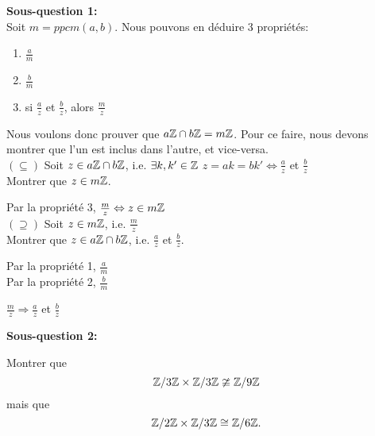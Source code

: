 \textbf{Sous-question 1:} \\

Soit $m = ppcm(a,b)$. Nous pouvons en déduire 3 propriétés:\\

\begin{enumerate}
	\item $\frac{a}{m}$
	\item $\frac{b}{m}$
	\item si $\frac{a}{z}$ et $\frac{b}{z}$, alors $\frac{m}{z}$ \\
\end{enumerate}

Nous voulons donc prouver que $a\mathbb{Z} \cap b\mathbb{Z} = m\mathbb{Z}$. Pour ce faire, nous devons montrer que l'un est inclus dans l'autre, et vice-versa. \\

$(\subseteq)$ Soit $z \in a\mathbb{Z} \cap b\mathbb{Z} $, i.e. $\exists k,{k}' \in \mathbb{Z} $ \hspace{1cm} $z = ak = b{k}' \Leftrightarrow \frac{a}{z}$ et $\frac{b}{z}$ \\

Montrer que $z \in m\mathbb{Z}$. 

Par la propriété 3, $\frac{m}{z} \Leftrightarrow z \in m\mathbb{Z}$ \\

$(\supseteq)$ Soit $z \in m\mathbb{Z} $, i.e. $\frac{m}{z}$ \\

Montrer que $z \in a\mathbb{Z} \cap b\mathbb{Z}$, i.e. $\frac{a}{z}$ et $\frac{b}{z}$. \\

\begin{minipage}{.5\textwidth}
	Par la propriété 1, $\frac{a}{m}$\\

	Par la propriété 2, $\frac{b}{m}$\\
\end{minipage}
\begin{minipage}{.5\textwidth}
	$\frac{m}{z} \Rightarrow \frac{a}{z}$ et $\frac{b}{z}$ \\
\end{minipage}

\vspace*{0.3cm}

\textbf{Sous-question 2:} \\

\vspace*{0.8cm}

\begin{exo}
Montrer que $$\mathbb{Z}/3\mathbb{Z} \times \mathbb{Z}/3\mathbb{Z} \ncong \mathbb{Z}/9\mathbb{Z}$$ mais que $$\mathbb{Z}/2\mathbb{Z} \times \mathbb{Z}/3\mathbb{Z} \cong \mathbb{Z}/6\mathbb{Z}.$$

\end{exo}